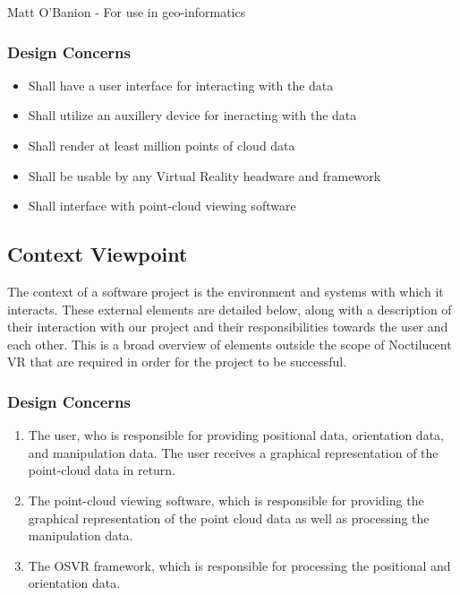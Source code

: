 Matt O'Banion - For use in geo-informatics

\subsubsection{Design Concerns}

\begin{itemize}
 \item Shall have a user interface for interacting with the data
 \item Shall utilize an auxillery device for ineracting with the data
 \item Shall render at least million points of cloud data
 \item Shall be usable by any Virtual Reality headware and framework
 \item Shall interface with point-cloud viewing software
\end{itemize}

\subsection{Context Viewpoint}

The context of a software project is the environment and systems with which it interacts. 
These external elements are detailed below, along with a description of their interaction with our project and their responsibilities towards the user and each other. 
This is a broad overview of elements outside the scope of Noctilucent VR that are required in order for the project to be successful. 

\subsubsection{Design Concerns}

\begin{enumerate}
\item The user, who is responsible for providing positional data, orientation data, and manipulation data. 
The user receives a graphical representation of the point-cloud data in return.
\item The point-cloud viewing software, which is responsible for providing the graphical representation of the point cloud data as well as processing the manipulation data.
\item The OSVR framework, which is responsible for processing the positional and orientation data.  
\end{enumerate}

